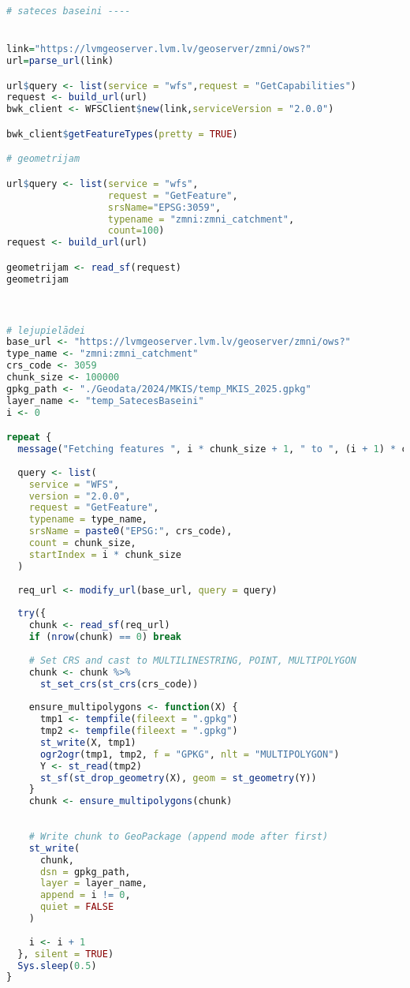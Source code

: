 \documentclass[
]{book}
\begin{document}
\begin{lstlisting}[language=R]
# sateces baseini ----


link="https://lvmgeoserver.lvm.lv/geoserver/zmni/ows?"
url=parse_url(link)

url$query <- list(service = "wfs",request = "GetCapabilities")
request <- build_url(url)
bwk_client <- WFSClient$new(link,serviceVersion = "2.0.0")

bwk_client$getFeatureTypes(pretty = TRUE)

# geometrijam

url$query <- list(service = "wfs",
                  request = "GetFeature",
                  srsName="EPSG:3059",
                  typename = "zmni:zmni_catchment",
                  count=100)
request <- build_url(url)

geometrijam <- read_sf(request)
geometrijam



# lejupielādei
base_url <- "https://lvmgeoserver.lvm.lv/geoserver/zmni/ows?"
type_name <- "zmni:zmni_catchment"
crs_code <- 3059
chunk_size <- 100000
gpkg_path <- "./Geodata/2024/MKIS/temp_MKIS_2025.gpkg"
layer_name <- "temp_SatecesBaseini"
i <- 0

repeat {
  message("Fetching features ", i * chunk_size + 1, " to ", (i + 1) * chunk_size, "...")
  
  query <- list(
    service = "WFS",
    version = "2.0.0",
    request = "GetFeature",
    typename = type_name,
    srsName = paste0("EPSG:", crs_code),
    count = chunk_size,
    startIndex = i * chunk_size
  )
  
  req_url <- modify_url(base_url, query = query)
  
  try({
    chunk <- read_sf(req_url)
    if (nrow(chunk) == 0) break
    
    # Set CRS and cast to MULTILINESTRING, POINT, MULTIPOLYGON
    chunk <- chunk %>%
      st_set_crs(st_crs(crs_code))
    
    ensure_multipolygons <- function(X) {
      tmp1 <- tempfile(fileext = ".gpkg")
      tmp2 <- tempfile(fileext = ".gpkg")
      st_write(X, tmp1)
      ogr2ogr(tmp1, tmp2, f = "GPKG", nlt = "MULTIPOLYGON")
      Y <- st_read(tmp2)
      st_sf(st_drop_geometry(X), geom = st_geometry(Y))
    }
    chunk <- ensure_multipolygons(chunk)
    
    
    # Write chunk to GeoPackage (append mode after first)
    st_write(
      chunk, 
      dsn = gpkg_path,
      layer = layer_name,
      append = i != 0,
      quiet = FALSE
    )
    
    i <- i + 1
  }, silent = TRUE)
  Sys.sleep(0.5)
}


\end{lstlisting}
\end{document}
